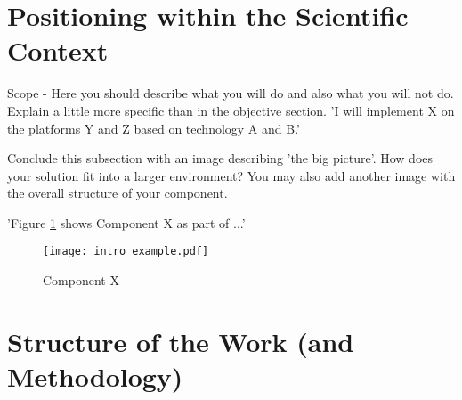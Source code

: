 \section{Positioning within the Scientific Context \label{sec:scope}}

Scope - Here you should describe what you will do and also what you will not do. Explain a little more specific than in the objective section. 'I will implement X on the platforms Y and Z based on technology A and B.'

Conclude this subsection with an image describing 'the big picture'. How does your solution fit into a larger environment? You may also add another image with the overall structure of your component.

'Figure \ref{fig:intro} shows Component X as part of ...' 
\\
\begin{figure}[htb]
  \centering
  \texttt{[image: intro\_example.pdf]}\\
  \caption{Component X}\label{fig:intro}
\end{figure}

\section{Structure of the Work (and Methodology) \label{sec:outline}}

